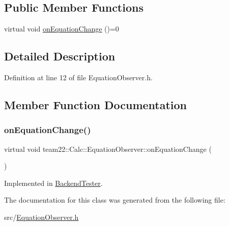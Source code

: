 \subsection*{Public Member Functions}
\begin{DoxyCompactItemize}
\item 
virtual void \hyperlink{classteam22_1_1_calc_1_1_equation_observer_a2fc2a1f8583f27b0087ff6053895ef25}{on\+Equation\+Change} ()=0
\end{DoxyCompactItemize}


\subsection{Detailed Description}


Definition at line 12 of file Equation\+Observer.\+h.



\subsection{Member Function Documentation}
\mbox{\label{classteam22_1_1_calc_1_1_equation_observer_a2fc2a1f8583f27b0087ff6053895ef25}} 
\subsubsection{\texorpdfstring{on\+Equation\+Change()}{onEquationChange()}}
{\footnotesize\ttfamily virtual void team22\+::\+Calc\+::\+Equation\+Observer\+::on\+Equation\+Change (\begin{DoxyParamCaption}{ }\end{DoxyParamCaption})\hspace{0.3cm}{\ttfamily [pure virtual]}}



Implemented in \hyperlink{class_backend_tester_a9b7caf17f8ad274936fab5ca4bc669f8}{Backend\+Tester}.



The documentation for this class was generated from the following file\+:\begin{DoxyCompactItemize}
\item 
src/\hyperlink{_equation_observer_8h}{Equation\+Observer.\+h}\end{DoxyCompactItemize}
